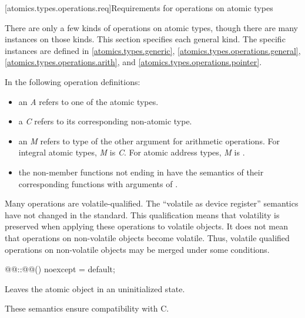 [atomics.types.operations.req]{Requirements for operations on atomic types}

\pnum
There are only a few kinds of operations on atomic types, though there are many
instances on those kinds. This section specifies each general kind. The specific
instances are defined in 
\ref{atomics.types.generic}, \ref{atomics.types.operations.general},
\ref{atomics.types.operations.arith}, and \ref{atomics.types.operations.pointer}.

\pnum
In the following operation definitions:

\begin{itemize}
\item  an \textit{A} refers to one of the atomic types.
\item a \textit{C} refers to its corresponding non-atomic type.
\item an \textit{M} refers to type of the other argument for arithmetic operations. For
integral atomic types, \textit{M} is \textit{C}. For atomic address types, \textit{M} is
.
\item the non-member functions not ending in  have the semantics of their
corresponding  functions with  arguments of
.
\end{itemize}

\pnum
\begin{note} Many operations are volatile-qualified. The ``volatile as device register''
semantics have not changed in the standard. This qualification means that volatility is
preserved when applying these operations to volatile objects. It does not mean that
operations on non-volatile objects become volatile. Thus, volatile qualified operations
on non-volatile objects may be merged under some conditions. \end{note}

%
%
%
\begin{itemdecl}
@@::@@() noexcept = default;
\end{itemdecl}

\begin{itemdescr}
\pnum
\effects
Leaves the atomic object in an uninitialized state.
\begin{note}
These semantics ensure compatibility with C.
\end{note}
\end{itemdescr}

